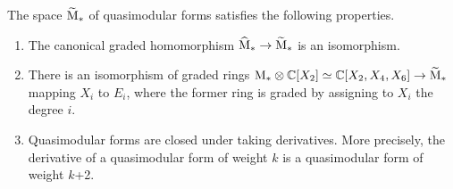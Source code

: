 \begin{prop} \label{pr:derivative} The space $\widetilde{\mathrm{M}}_*$ of quasimodular forms satisfies the following properties.
 \begin{enumerate}
  \item The canonical graded homomorphism $\widehat{\mathrm{M}}_* \to \widetilde{\mathrm{M}}_*$ is an isomorphism.
  \item There is an isomorphism of graded rings $\mathrm{M}_* \otimes \mathbb{C}[X_2] \simeq \mathbb{C}[X_2, X_4, X_6]\to \widetilde{\mathrm{M}}_*$ mapping $X_i$ to $E_i$, where the former ring is graded by assigning to $X_i$ the degree $i$.
  \item Quasimodular forms are closed under taking derivatives. More precisely, the derivative of a quasimodular form of weight $k$ is a quasimodular form of weight $k$+2.
 \end{enumerate}
\end{prop}
